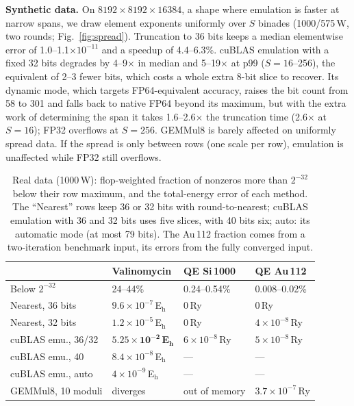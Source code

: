 \documentclass[conference]{IEEEtran}
\newcommand{\W}{\,W}
\newcommand{\Eh}{\,E$_\mathrm{h}$}
\newcommand{\Ry}{\,Ry}
\newcommand{\ee}[2]{#1{\times}10^{#2}}  %
\newcommand{\pct}{\%}
\begin{document}
\textbf{Synthetic data.} On $8192{\times}8192{\times}16384$, a shape where emulation is faster at narrow spans, we
draw element exponents uniformly over $S$ binades (1000/575\W, two rounds; Fig.~\ref{fig:spread}). Truncation to 36
bits keeps a median elementwise error of 1.0--1.1$\times10^{-11}$ and a speedup of 4.4--6.3\pct. cuBLAS emulation with
a fixed 32 bits degrades by 4--9$\times$ in median and 5--19$\times$ at p99 ($S=16$--256), the equivalent of 2--3
fewer bits, which costs a whole extra 8-bit slice to recover. Its dynamic mode, which targets FP64-equivalent
accuracy, raises the bit count from 58 to 301 and falls back to native FP64 beyond its maximum, but with the extra
work of determining the span it takes 1.6--2.6$\times$ the truncation time (2.6$\times$ at $S=16$); FP32 overflows
at $S=256$. GEMMul8 is barely affected on uniformly spread data. If the spread is only between rows (one scale per
row), emulation is unaffected while FP32 still overflows.

\begin{table}[t]
\caption{Real data (1000\W): flop-weighted fraction of nonzeros more than $2^{-32}$ below their row maximum, and the
total-energy error of each method. The ``Nearest'' rows keep 36 or 32 bits with round-to-nearest; cuBLAS emulation
with 36 and 32 bits uses five slices, with 40 bits six; auto: its automatic mode (at most 79 bits). The Au\,112
fraction comes from a two-iteration benchmark input, its errors from the fully converged input.}\label{tab:span}
\centering\footnotesize\setlength{\tabcolsep}{4pt}
\begin{tabular}{@{}llll@{}}
\toprule
& Valinomycin & QE Si\,1000 & QE Au\,112 \\
\midrule
Below $2^{-32}$ & 24--44\pct & 0.24--0.54\pct & 0.008--0.02\pct \\
Nearest, 36 bits & $\ee{9.6}{-7}$\Eh & 0\Ry & 0\Ry \\
Nearest, 32 bits & $\ee{1.2}{-5}$\Eh & 0\Ry & $\ee{4}{-8}$\Ry \\
cuBLAS emu., 36/32 & $\mathbf{\ee{5.25}{-2}}$\,\textbf{E}$_\mathbf{h}$ & $\ee{6}{-8}$\Ry & $\ee{5}{-8}$\Ry \\
cuBLAS emu., 40 & $\ee{8.4}{-8}$\Eh & --- & --- \\
cuBLAS emu., auto & $\ee{4}{-9}$\Eh & --- & --- \\
GEMMul8, 10 moduli & diverges & out of memory & $\ee{3.7}{-7}$\Ry \\
\bottomrule
\end{tabular}
\end{table}
\end{document}
